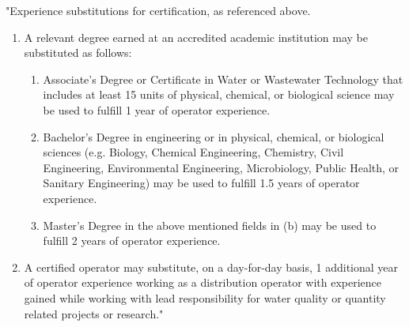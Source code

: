 \documentclass[10pt]{article}
\begin{document}
"Experience substitutions for certification, as referenced above.
\begin{enumerate}[]
\item A relevant degree earned at an accredited academic institution may be substituted as follows:
\begin{enumerate}[label=(\alph*)]
\item Associate’s Degree or Certificate in Water or Wastewater Technology that includes at least 15 units of physical, chemical, or biological science may be used to fulfill 1 year of operator experience.
\item Bachelor’s Degree in engineering or in physical, chemical, or biological sciences (e.g. Biology, Chemical Engineering, Chemistry, Civil Engineering, Environmental Engineering, Microbiology, Public Health, or Sanitary Engineering) may be used to fulfill 1.5 years of operator experience.
\item Master’s Degree in the above mentioned fields in (b) may be used to fulfill 2 years of operator experience.
\end{enumerate}
\item A certified operator may substitute, on a day-for-day basis, 1 additional year of operator experience working as a distribution operator with experience gained while working with lead responsibility for water quality or quantity related projects or research."	
\end{enumerate}		
\newpage
\end{document}
